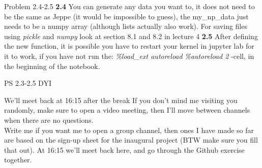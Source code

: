 \documentclass[10pt,danish,t,10pt]{beamer}
\newcommand{\code}[1]{\textit{#1}} %
\begin{document}
\begin{frame}{Problem 2.4-2.5}
    \textbf{2.4} \newline 
    You can generate any data you want to, it does not need to be the same as Jeppe (it would be impossible to guess), the my\_np\_data just needs to be a numpy array (although lists actually also work). \newline
    For saving files using \code{pickle} and \code{numpy} look at section 8.1 and 8.2 in lecture 4 \newline
    \textbf{2.5} \newline 
    After defining the new function, it is possible you have to restart your kernel in jupyter lab for it to work, if you have not run the:\newline
    \code{\%load\_ext autoreload} \newline
    \code{\%autoreload 2}\newline
    -cell, in the beginning of the notebook.
\end{frame}


\begin{frame}{PS 2.3-2.5 DYI}
    \begin{alertblock}{We'll meet back at 16:15 after the break}
    If you don't mind me visiting you randomly, make sure to open a video meeting, then I'll move between channels when there are no questions. \\
    Write me if you want me to open a group channel, then ones I have made so far are based on the sign-up sheet for the inaugural project (BTW make sure you fill that out).
    At 16:15 we'll meet back here, and go through the Github exercise together.
    \end{alertblock}
\end{frame}
\end{document}
